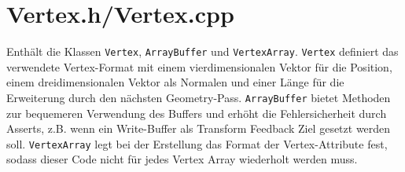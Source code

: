 \section{Vertex.h/Vertex.cpp}
Enthält die Klassen \lstinline{Vertex}, \lstinline{ArrayBuffer} und \lstinline{VertexArray}. \lstinline{Vertex} definiert das verwendete Vertex-Format mit einem vierdimensionalen Vektor für die Position, einem dreidimensionalen Vektor als Normalen und einer Länge für die Erweiterung durch den nächsten Geometry-Pass. \lstinline{ArrayBuffer} bietet Methoden zur bequemeren Verwendung des Buffers und erhöht die Fehlersicherheit durch Asserts, z.B. wenn ein Write-Buffer als Transform Feedback Ziel gesetzt werden soll. \lstinline{VertexArray} legt bei der Erstellung das Format der Vertex-Attribute fest, sodass dieser Code nicht für jedes Vertex Array wiederholt werden muss.